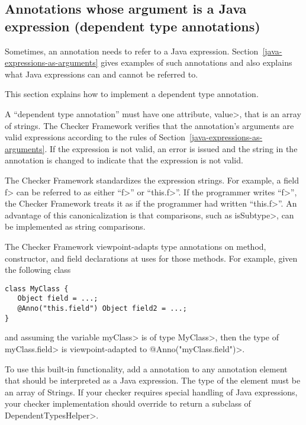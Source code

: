 \subsection{Annotations whose argument is a Java expression (dependent type annotations)\label{dependent-types}}
\label{expression-annotations}

Sometimes, an annotation needs to refer to a Java expression.
Section~\ref{java-expressions-as-arguments} gives examples of such
annotations and also explains what Java expressions can and cannot be
referred to.

This section explains how to implement a dependent type annotation.

A ``dependent type annotation''
must have one attribute, \<value>, that is an
array of strings.  The Checker Framework verifies that the annotation's
arguments are valid expressions according to the rules of
Section~\ref{java-expressions-as-arguments}.  If
the expression is not valid, an error is issued and the string in the
annotation is changed to indicate that the expression is not valid.

The Checker Framework standardizes the expression strings.  For example, a
field \<f> can be referred to as either ``\<f>'' or ``\<this.f>''.  If the
programmer writes ``\<f>'', the Checker Framework treats it
as if the programmer had written ``\<this.f>''.
An advantage of this canonicalization is
that comparisons, such as \<isSubtype>, can be implemented as string comparisons.

The Checker Framework viewpoint-adapts type annotations on method, constructor,
and field declarations at uses for those methods.  For example, given the
following class

\begin{Verbatim}
class MyClass {
   Object field = ...;
   @Anno("this.field") Object field2 = ...;
}
\end{Verbatim}
and assuming the variable \<myClass> is of type \<MyClass>, then the type of
\<myClass.field> is viewpoint-adapted to \<@Anno("myClass.field")>.

To use this built-in functionality, add a  annotation
to any annotation element that should be interpreted as a Java expression.  The type of the
element must be an array of Strings.  If your checker requires special handling of Java expressions,
your checker implementation should override
to return a subclass of \<DependentTypesHelper>.


